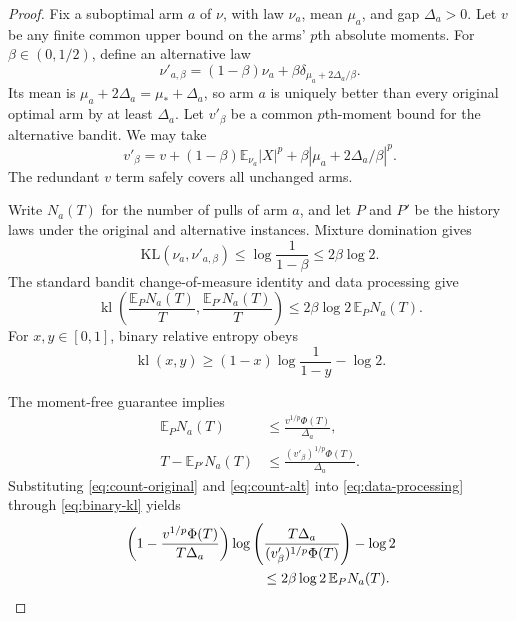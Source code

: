 \documentclass[twoside]{article}
\newcommand{\E}{\mathbb E}
\begin{document}
\begin{proof}
Fix a suboptimal arm $a$ of $\nu$, with law $\nu_a$, mean $\mu_a$, and gap
$\Delta_a>0$. Let $v$ be any finite common upper bound on the arms' $p$th
absolute moments. For $\beta\in(0,1/2)$, define an alternative law
\begin{equation}
 \nu'_{a,\beta}
 =(1-\beta)\nu_a+
 \beta\delta_{\mu_a+2\Delta_a/\beta}.
 \label{eq:alternative}
\end{equation}
Its mean is $\mu_a+2\Delta_a=\mu_*+\Delta_a$, so arm $a$ is uniquely better
than every original optimal arm by at least $\Delta_a$. Let $v'_\beta$ be a
common $p$th-moment bound for the alternative bandit. We may take
\begin{equation}
 v'_\beta
 =v+(1-\beta)\E_{\nu_a}|X|^p
 +\beta|\mu_a+2\Delta_a/\beta|^p.
 \label{eq:vprime}
\end{equation}
The redundant $v$ term safely covers all unchanged arms.

Write $N_a(T)$ for the number of pulls of arm $a$, and let $P$ and $P'$ be
the history laws under the original and alternative instances. Mixture
domination gives
\[
 \mathrm{KL}(\nu_a,\nu'_{a,\beta})
 \leq\log\frac1{1-\beta}\leq2\beta\log2.
\]
The standard bandit change-of-measure identity and data processing give
\begin{equation}
 \operatorname{kl}\left(
 \frac{\E_PN_a(T)}T,
 \frac{\E_{P'}N_a(T)}T\right)
 \leq2\beta\log2\,\E_PN_a(T).
 \label{eq:data-processing}
\end{equation}
For $x,y\in[0,1]$, binary relative entropy obeys
\begin{equation}
 \operatorname{kl}(x,y)
 \geq(1-x)\log\frac1{1-y}-\log2.
 \label{eq:binary-kl}
\end{equation}

The moment-free guarantee implies
\begin{align}
 \E_PN_a(T)&\leq \frac{v^{1/p}\Phi(T)}{\Delta_a},
 \label{eq:count-original}\\
 T-\E_{P'}N_a(T)&\leq
 \frac{(v'_\beta)^{1/p}\Phi(T)}{\Delta_a}.
 \label{eq:count-alt}
\end{align}
Substituting \eqref{eq:count-original} and \eqref{eq:count-alt} into
\eqref{eq:data-processing} through \eqref{eq:binary-kl} yields
\begin{align}
 &\left(1-\frac{v^{1/p}\Phi(T)}{T\Delta_a}\right)
 \log\left(\frac{T\Delta_a}{(v'_\beta)^{1/p}\Phi(T)}\right)-\log2
 \nonumber\\
 &\hspace{35mm}\leq2\beta\log2\,\E_PN_a(T).
 \label{eq:key-lower}
\end{align}


\end{proof}
\end{document}
